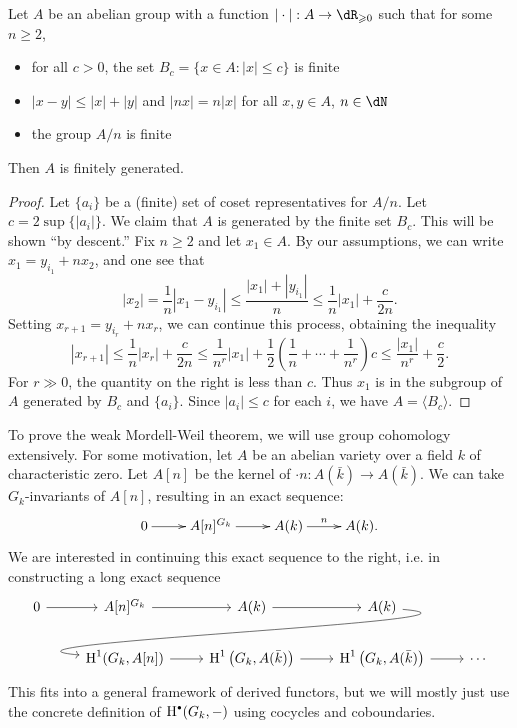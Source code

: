 \begin{lemma}
Let $A$ be an abelian group with a function 
$|\cdot|:A\to \dR_{\geqslant 0}$ such that for some $n\geqslant 2$, 
\begin{itemize}
  \item for all $c>0$, the set $B_c = \{x\in A:|x|\leqslant c\}$ 
    is finite
  \item $|x-y|\leqslant |x|+|y|$ and $|n x|=n |x|$ for all 
    $x,y\in A$, $n\in \dN$
  \item the group $A/n$ is finite
\end{itemize}
Then $A$ is finitely generated. 
\end{lemma}
\begin{proof}
Let $\{a_i\}$ be a (finite) set 
of coset representatives for $A/n$. Let $c=2\sup \{|a_i|\}$. We claim that $A$ 
is generated by the finite set $B_c$. This will be shown ``by descent.'' Fix 
$n\geqslant 2$ and let $x_1\in A$. By our assumptions, we can write 
$x_1 = y_{i_1} + n x_2$, and one see that 
\[
  |x_2| = \frac 1 n |x_1 - y_{i_1}| 
    \leqslant \frac{|x_1| + |y_{i_1}|}{n} 
    \leqslant \frac 1 n |x_1| + \frac{c}{2 n} \text{.}
\]
Setting $x_{r+1} = y_{i_r} + n x_r$, we can continue this process, obtaining 
the inequality 
\[
  |x_{r+1}| \leqslant \frac 1 n |x_r| + \frac{c}{2 n}
    \leqslant \frac{1}{n^r} |x_1| + \frac 1 2\left(\frac 1 n + \cdots + \frac{1}{n^r}\right) c 
    \leqslant \frac{|x_1|}{n^r} + \frac c 2 \text{.}
\]
For $r\gg 0$, the quantity on the right is less than $c$. Thus $x_1$ is in the 
subgroup of $A$ generated by $B_c$ and $\{a_i\}$. Since $|a_i|\leqslant c$ for 
each $i$, we have $A=\langle B_c\rangle$. 
\end{proof}

To prove the weak Mordell-Weil theorem, we will use group cohomology 
extensively. For some motivation, let $A$ be an abelian variety over a field 
$k$ of characteristic zero. 
Let $A[n]$ be the kernel of $\cdot n : A(\bar k)\to A(\bar k)$. We can take 
$G_k$-invariants of $A[n]$, resulting in an exact sequence: 
\[\xymatrix{
  0 \ar[r] 
    & A[n]^{G_k} \ar[r] 
    & A(k) \ar[r]^-n 
    & A(k) \text{.}
}\]
We are interested in continuing this exact sequence to the right, i.e. in 
constructing a long exact sequence 
\[
\begin{tikzcd}
  0 \rar 
    & A[n]^{G_k} \rar 
    & A(k) \rar 
    & A(k) \ar[out=355,in=175, overlay]{dll} \\
  & \h^1(G_k,A[n]) \rar 
    & \h^1\left(G_k,A(\bar k)\right) \rar 
    & \h^1\left(G_k,A(\bar k)\right) \rar
    & \cdots
\end{tikzcd}
\]
This fits into a general framework of derived functors, but we will mostly 
just use the concrete definition of $\h^\bullet(G_k,-)$ using cocycles and 
coboundaries. 

